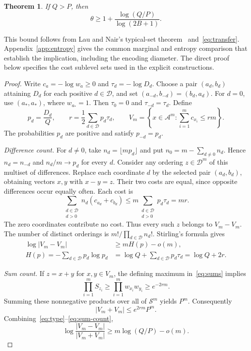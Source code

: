 \documentclass[11pt,a4paper]{article}
\newtheorem{theorem}{Theorem}
\newcommand{\A}{\mathcal A}
\newcommand{\D}{\mathcal D}
\newcommand{\Sset}{\mathcal S}
\begin{document}
\begin{theorem}\label{thm:weighted}
If $Q>P$, then
\begin{equation}\label{eq:bound}
 \theta\ge 1+\frac{\log(Q/P)}{\log(2B+1)}.
\end{equation}
\end{theorem}

This bound follows from Lau and Nair's typical-set
theorem~\cite[Theorem~10, v3]{launair} and~\eqref{eq:transfer}.
Appendix~\ref{app:entropy} gives the common marginal and entropy comparison
that establish the implication, including the encoding diameter.
The direct proof below specifies the cost sublevel sets used in the
explicit constructions.

\begin{proof}
Write $c_a=-\log w_a\ge0$ and $\tau_d=-\log D_d$. Choose a pair
$(a_d,b_d)$ attaining $D_d$ for each positive $d\in\D$, and set
$(a_{-d},b_{-d})=(b_d,a_d)$. For $d=0$, use $(a_*,a_*)$, where
$w_{a_*}=1$. Then $\tau_0=0$ and $\tau_{-d}=\tau_d$. Define
\[
 p_d=\frac{D_d}{Q},
 \qquad
 r=\frac12\sum_{d\in\D}p_d\tau_d,
 \qquad
 V_m=\left\{x\in\A^m:\sum_{i=1}^m c_{x_i}\le rm\right\}.
\]
The probabilities $p_d$ are positive and satisfy $p_{-d}=p_d$.

\smallskip\noindent\emph{Difference count.}
For $d\ne0$, take $n_d=\lfloor mp_d\rfloor$ and put
$n_0=m-\sum_{d\ne0}n_d$. Hence $n_d=n_{-d}$ and $n_d/m\to p_d$ for
every $d$. Consider any ordering $z\in\D^m$ of this multiset of
differences. Replace each coordinate $d$ by the selected pair
$(a_d,b_d)$, obtaining vectors $x,y$ with $x-y=z$.
Their two costs are equal, since opposite differences occur equally often.
Each cost is
\[
 \sum_{\substack{d\in\D\\d>0}}n_d(c_{a_d}+c_{b_d})
 \le m\sum_{\substack{d\in\D\\d>0}}p_d\tau_d
 =mr.
\]
The zero coordinates contribute no cost. Thus every such $z$ belongs to
$V_m-V_m$. The number of distinct orderings is
$m!/\prod_{d\in\D}n_d!$. Stirling's formula gives
\begin{align}
 \log|V_m-V_m|
 &\ge mH(p)-o(m),\label{eq:type}\\
 H(p)=-\sum_{d\in\D}p_d\log p_d
 &=\log Q+\sum_{d\in\D}p_d\tau_d
 =\log Q+2r.\label{eq:entropy}
\end{align}

\smallskip\noindent\emph{Sum count.}
If $z=x+y$ for $x,y\in V_m$, the defining maximum in~\eqref{eq:sums}
implies
\[
 \prod_{i=1}^m S_{z_i}
 \ge\prod_{i=1}^m w_{x_i}w_{y_i}
 \ge e^{-2rm}.
\]
Summing these nonnegative products over all of $\Sset^m$ yields $P^m$.
Consequently
\begin{equation}\label{eq:sum-count}
 |V_m+V_m|\le e^{2rm}P^m.
\end{equation}
Combining~\eqref{eq:type}--\eqref{eq:sum-count},
\begin{equation}\label{eq:ratio}
 \log\frac{|V_m-V_m|}{|V_m+V_m|}
 \ge m\log(Q/P)-o(m).
\end{equation}


\end{proof}
\end{document}
